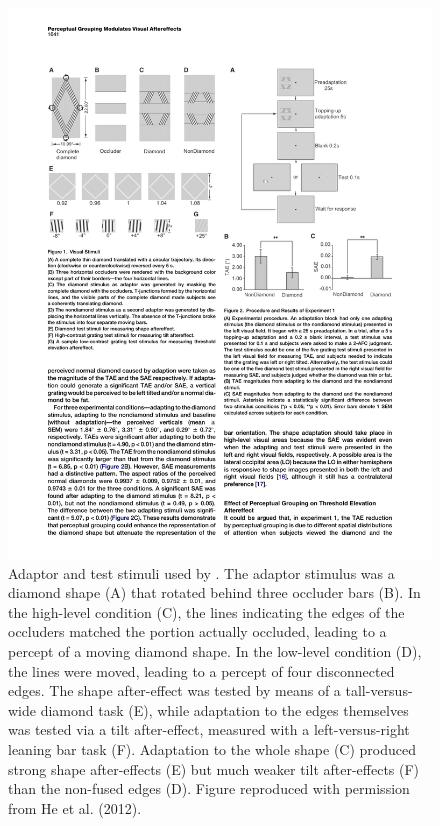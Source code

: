 \begin{figure}[!ht]
  \centering
  \includegraphics[]{he-et-al-2012-fig1.pdf}  
  \caption{Adaptor and test stimuli used by \protect\textcite{He2012}.  The adaptor stimulus was a diamond shape (A) that rotated behind three occluder bars (B).  In the high-level condition (C), the lines indicating the edges of the occluders matched the portion actually occluded, leading to a percept of a moving diamond shape.  In the low-level condition (D), the lines were moved, leading to a percept of four disconnected edges.  The shape after-effect was tested by means of a tall-versus-wide diamond task (E), while adaptation to the edges themselves was tested via a tilt after-effect, measured with a left-versus-right leaning bar task (F).  Adaptation to the whole shape (C) produced strong shape after-effects (E) but much weaker tilt after-effects (F) than the non-fused edges (D).  Figure reproduced with permission from He et al. (2012).}
  \label{fig:he-et-al-2012-stims}
\end{figure}

